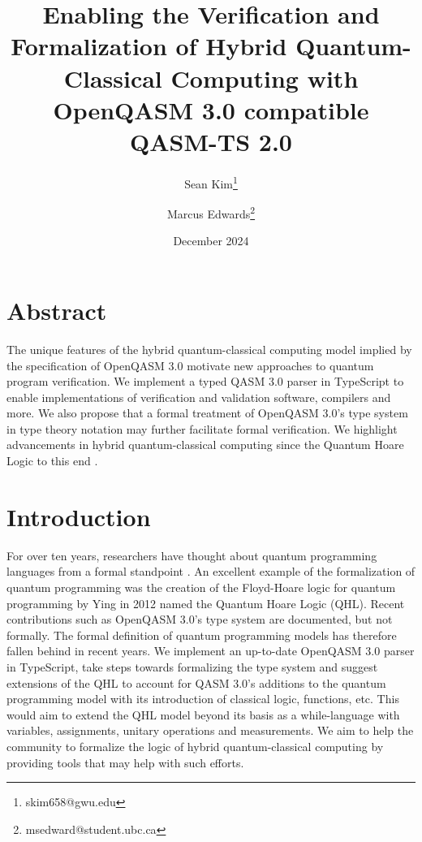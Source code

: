 \documentclass{article}
\title{Enabling the Verification and Formalization of Hybrid Quantum-Classical Computing with OpenQASM 3.0 compatible QASM-TS 2.0}
\author[1]{Sean Kim\thanks{skim658@gwu.edu}}
\author[2]{Marcus Edwards\thanks{msedward@student.ubc.ca}}
\affil[1]{The Department of Biochemistry \& Molecular Medicine,
Washington DC 20037, United States of America}
\affil[2]{Electrical and Computer Engineering,
University of British Columbia, Vancouver, BC, CA}
\date{December 2024}
\begin{document}
\maketitle

\section{Abstract}

The unique features of the hybrid quantum-classical computing model implied by the specification of OpenQASM 3.0 motivate new approaches to quantum program verification. We implement a typed QASM 3.0 parser in TypeScript to enable implementations of verification and validation software, compilers and more. We also propose that a formal treatment of OpenQASM 3.0's type system in type theory notation may further facilitate formal verification. We highlight advancements in hybrid quantum-classical computing since the Quantum Hoare Logic to this end \cite{ying_floyd--hoare_2012}.

\section{Introduction}

For over ten years, researchers have thought about quantum programming languages from a formal standpoint \cite{exman_verification_2024}. An excellent example of the formalization of quantum programming was the creation of the Floyd-Hoare logic for quantum programming by Ying in 2012 \cite{ying_floyd--hoare_2012} named the Quantum Hoare Logic (QHL). Recent contributions such as OpenQASM 3.0's type system are documented, \cite{noauthor_types_nodate} but not formally. The formal definition of quantum programming models has therefore fallen behind in recent years. We implement an up-to-date OpenQASM 3.0 parser in TypeScript, take steps towards formalizing the type system and suggest extensions of the QHL to account for QASM 3.0's additions to the quantum programming model with its introduction of classical logic, functions, etc. This would aim to extend the QHL model beyond its basis as a while-language with variables, assignments, unitary operations and measurements. We aim to help the community to formalize the logic of hybrid quantum-classical computing by providing tools that may help with such efforts.
\end{document}
